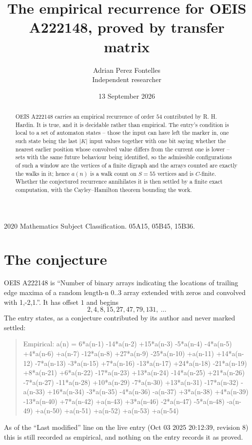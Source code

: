 \documentclass[11pt,a4paper]{article}
\title{The empirical recurrence for OEIS A222148, proved by transfer matrix}
\author{Adrian Perez Fontelles\\ \small Independent researcher}
\date{13 September 2026}
\theoremstyle{plain}
\theoremstyle{definition}
\begin{document}
\maketitle

\begin{abstract}
OEIS A222148 carries an empirical recurrence of order $54$ contributed by R. H. Hardin. It is
true, and it is decidable rather than empirical. The entry's condition is local to a set of automaton states -- those the input can have left the marker in, one such state being the last $|K|$ input values together with one bit saying whether the nearest earlier position whose convolved value differs from the current one is lower -- sets with the same future behaviour being identified, so
the admissible configurations of such a window are the vertices of a finite digraph and the
arrays counted are exactly the walks in it; hence $a(n)$ is a walk count on $S=55$ vertices
and is $C$-finite. Whether the conjectured recurrence annihilates it is then settled by a
finite exact computation, with the Cayley--Hamilton theorem bounding the work.
\end{abstract}

\noindent\small 2020 Mathematics Subject Classification. 05A15, 05B45, 15B36.\normalsize

\section{The conjecture}

OEIS A222148 is ``Number of binary arrays indicating the locations of trailing edge maxima of a random length-n 0..3 array extended with zeros and convolved with 1,-2,1.''. It has offset $1$ and begins
\[
2, 4, 8, 15, 27, 47, 79, 131,\ \dots
\]
The entry states, as a conjecture contributed by its author and never marked settled:
\begin{quote}
Empirical: a(n) = 6*a(n-1) -14*a(n-2) +15*a(n-3) -5*a(n-4) -4*a(n-5) +4*a(n-6) +a(n-7) -12*a(n-8) +27*a(n-9) -25*a(n-10) +a(n-11) +14*a(n-12) -7*a(n-13) -3*a(n-15) +7*a(n-16) -13*a(n-17) +24*a(n-18) -21*a(n-19) +8*a(n-21) +6*a(n-22) -17*a(n-23) +13*a(n-24) -14*a(n-25) +21*a(n-26) -7*a(n-27) -11*a(n-28) +10*a(n-29) -7*a(n-30) +13*a(n-31) -17*a(n-32) -a(n-33) +16*a(n-34) -3*a(n-35) -4*a(n-36) -a(n-37) +3*a(n-38) +4*a(n-39) -13*a(n-40) +7*a(n-42) +a(n-43) +3*a(n-46) -2*a(n-47) -5*a(n-48) -a(n-49) +a(n-50) +a(n-51) +a(n-52) +a(n-53) +a(n-54)
\end{quote}
As of the ``Last modified'' line on the live entry (Oct 03 2025 20:12:39, revision 8) this is still
recorded as empirical, and nothing on the entry records it as proved.
\end{document}
